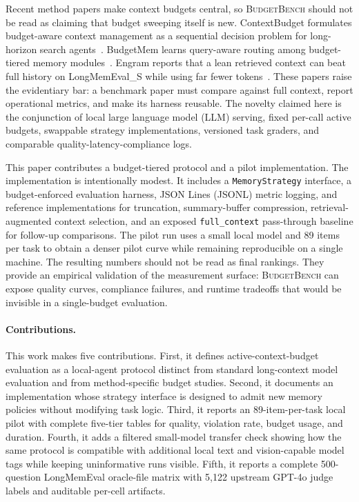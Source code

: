 \documentclass[11pt]{article}
\newcommand{\BudgetBench}{\textsc{BudgetBench}}
\begin{document}
Recent method papers make context budgets central, so \BudgetBench{} should
not be read as claiming that budget sweeping itself is new.  ContextBudget
formulates budget-aware context management as a sequential decision problem
for long-horizon search agents~\citep{wu2026contextbudget}.  BudgetMem learns
query-aware routing among budget-tiered memory
modules~\citep{zhang2026budgetmem}.  Engram reports that a lean retrieved context can
beat full history on LongMemEval\_S while using far fewer
tokens~\citep{wang2026engram}.  These papers raise the evidentiary bar: a benchmark
paper must compare against full context, report operational metrics, and make
its harness reusable.  The novelty claimed here is the conjunction of local
large language model (LLM) serving, fixed per-call active budgets, swappable
strategy implementations, versioned task graders, and comparable
quality-latency-compliance logs.

This paper contributes a budget-tiered protocol and a pilot implementation.
The implementation is intentionally modest.  It includes a
\texttt{MemoryStrategy} interface, a budget-enforced evaluation harness, JSON
Lines (JSONL) metric logging, and reference implementations for truncation,
summary-buffer compression, retrieval-augmented context selection, and an exposed
\texttt{full\_context} pass-through baseline for follow-up comparisons.  The
pilot run uses a small local model and 89 items per task to obtain a denser
pilot curve while remaining reproducible on a single machine.  The resulting
numbers should not be read as final rankings.  They provide an empirical
validation of the measurement surface: \BudgetBench{} can expose quality
curves, compliance failures, and runtime tradeoffs that would be invisible in
a single-budget evaluation.

\paragraph{Contributions.}
This work makes five contributions.  First, it defines active-context-budget
evaluation as a local-agent protocol distinct from standard long-context model
evaluation and from method-specific budget studies.  Second, it documents an
implementation whose strategy interface is designed to admit new memory policies without
modifying task logic.  Third, it reports an 89-item-per-task local pilot with complete
five-tier tables for quality, violation rate, budget usage, and duration.
Fourth, it adds a filtered small-model transfer check showing how the same
protocol is compatible with additional local text and vision-capable model
tags while keeping uninformative runs visible.  Fifth, it reports a complete
500-question LongMemEval oracle-file matrix with 5,122 upstream GPT-4o judge
labels and auditable per-cell artifacts.
\end{document}
